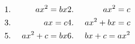\documentclass[preview]{standalone}
\begin{document}
\begin{align*}
&1.&\hspace{-0.5cm} ax^2 = bx    &2.&\ ax^2 = c \\ &3.&\ ax = c    &4.&\ ax^2+bx = c \\ &5.&\ ax^2+c = bx  &6.&\ bx+c = ax^2
\end{align*}
\end{document}
